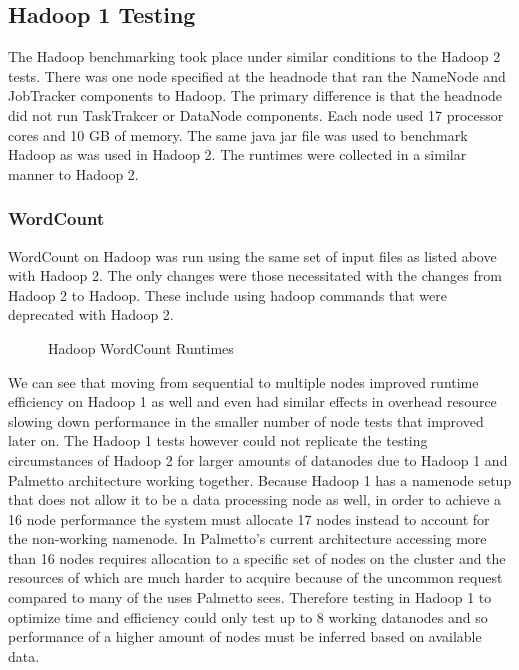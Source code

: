 \documentclass[conference]{IEEEtran}
\begin{document}
				\subsection{Hadoop 1 Testing}
					The Hadoop benchmarking took place under similar conditions to the Hadoop 2 tests. There was one node specified at the headnode that ran the NameNode and JobTracker components to Hadoop. The primary difference is that the headnode did not run TaskTrakcer or DataNode components. Each node used 17 processor cores and 10 GB of memory. The same java jar file was used to benchmark Hadoop as was used in Hadoop 2. The runtimes were collected in a similar manner to Hadoop 2.
					\subsubsection{WordCount}
					WordCount on Hadoop was run using the same set of input files as listed above with Hadoop 2. The only changes were those necessitated with the changes from Hadoop 2 to Hadoop. These include using hadoop commands that were deprecated with Hadoop 2.

						\begin{figure}[h]
                   					\begin{center}
                       						
                        						\caption{Hadoop WordCount Runtimes}
                    				\end{center}
                  			\end{figure}

					We can see that moving from sequential to multiple nodes improved runtime efficiency on Hadoop 1 as well and even had similar effects in overhead resource slowing down performance in the smaller number of node tests that improved later on. The Hadoop 1 tests however could not replicate the testing circumstances of Hadoop 2 for larger amounts of datanodes due to Hadoop 1 and Palmetto architecture working together. Because Hadoop 1 has a namenode setup that does not allow it to be a data processing node as well, in order to achieve a 16 node performance the system must allocate 17 nodes instead to account for the non-working namenode. In Palmetto’s current architecture accessing more than 16 nodes requires allocation to a specific set of nodes on the cluster and the resources of which are much harder to acquire because of the uncommon request compared to many of the uses Palmetto sees. Therefore testing in Hadoop 1 to optimize time and efficiency could only test up to 8 working datanodes and so performance of a higher amount of nodes must be inferred based on
available data.
\end{document}
